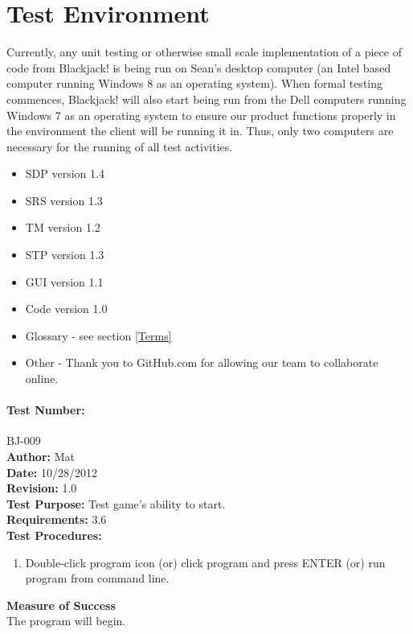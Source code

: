 \documentclass{article}
\def\SDPVersion{1.4}
\def\SRSVersion{1.3}
\def\TMVersion{1.2}
\def\STPVersion{1.3}
\def\GUIVersion{1.1}
\def\CodeVersion{1.0}
\begin{document}
\section{Test Environment}

Currently, any unit testing or otherwise small scale implementation of a piece of code from Blackjack! is being run on Sean’s desktop computer (an Intel based computer running Windows 8 as an operating system). When formal testing commences, Blackjack! will also start being run from the Dell computers running Windows 7 as an operating system to ensure our product functions properly in the environment the client will be running it in.  Thus, only two computers are necessary for the running of all test activities.  


\begin{itemize}
\item SDP version \SDPVersion
\item SRS version \SRSVersion
\item TM version \TMVersion
\item STP version \STPVersion
\item GUI version \GUIVersion
\item Code version \CodeVersion
\item Glossary - see section \ref {Terms}
\item Other - Thank you to GitHub.com for allowing our team to collaborate online.  
\end{itemize}
\paragraph{Test Number:} BJ-009\\
\textbf{Author:} Mat\\
\textbf{Date:} 10/28/2012\\
\textbf{Revision:} 1.0\\
\textbf{Test Purpose:} Test game's ability to start.\\
\textbf{Requirements:} 3.6 \\
\textbf{Test Procedures:} 
\begin{enumerate}
\item Double-click program icon (or) click program and press ENTER (or) run program from command line.
\end{enumerate}
\textbf{Measure of Success}\\The program will begin.
\end{document}
